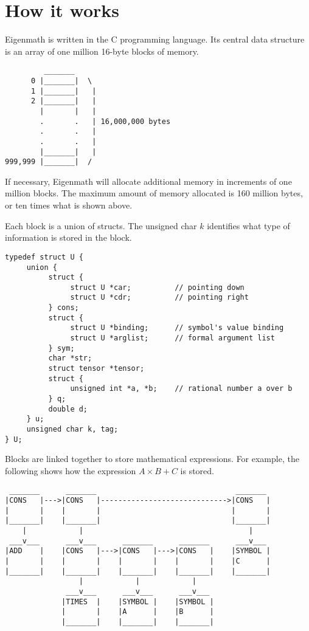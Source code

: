\chapter{How it works}

Eigenmath is written in the C programming language.
Its central data structure is
an array of one million 16-byte blocks of memory.

\begin{verbatim}
         _______ 
      0 |_______|  \
      1 |_______|   |
      2 |_______|   |
        |       |   |
        .       .   | 16,000,000 bytes
        .       .   |
        .       .   |
        |_______|   |
999,999 |_______|  /
\end{verbatim}

\medskip
\noindent
If necessary, Eigenmath will allocate additional memory in increments of one
million blocks.
The maximum amount of memory allocated is 160 million bytes,
or ten times what is shown above.

\newpage

\noindent
Each block is a union of structs.
The unsigned char $k$ identifies what type of information is stored in the
block.

\medskip
\begin{verbatim}
typedef struct U {
     union {
          struct {
               struct U *car;          // pointing down
               struct U *cdr;          // pointing right
          } cons;
          struct {
               struct U *binding;      // symbol's value binding
               struct U *arglist;      // formal argument list
          } sym;
          char *str;
          struct tensor *tensor;
          struct {
               unsigned int *a, *b;    // rational number a over b
          } q;
          double d;
     } u;
     unsigned char k, tag;
} U;
\end{verbatim}

\newpage

\noindent
Blocks are linked together to store mathematical expressions.
For example, the following shows how the expression
$A\times B+C$ is stored.

\begin{verbatim}
 _______      _______                                _______
|CONS   |--->|CONS   |----------------------------->|CONS   |
|       |    |       |                              |       |
|_______|    |_______|                              |_______|
    |            |                                      |
 ___v___      ___v___      _______      _______      ___v___
|ADD    |    |CONS   |--->|CONS   |--->|CONS   |    |SYMBOL |
|       |    |       |    |       |    |       |    |C      |
|_______|    |_______|    |_______|    |_______|    |_______|
                 |            |            |
              ___v___      ___v___      ___v___
             |TIMES  |    |SYMBOL |    |SYMBOL |
             |       |    |A      |    |B      |
             |_______|    |_______|    |_______|
\end{verbatim}

